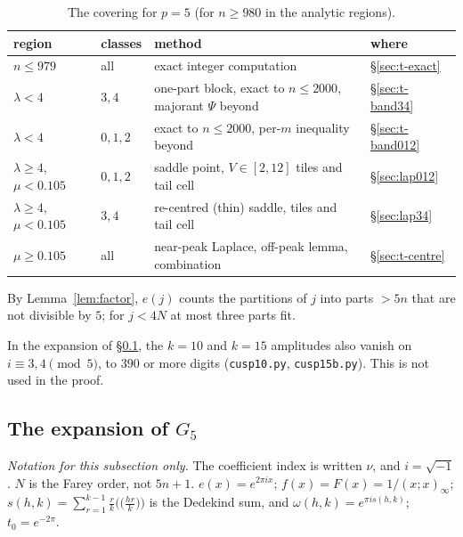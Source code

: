 \begin{table}[h]
\centering
\small
\begin{tabular}{llll}
\toprule
region & classes & method & where\\
\midrule
$n\le979$ & all & exact integer computation & \S\ref{sec:t-exact}\\
$\lambda<4$ & $3,4$ & one-part block, exact to $n\le2000$, majorant $\Psi$ beyond & \S\ref{sec:t-band34}\\
$\lambda<4$ & $0,1,2$ & exact to $n\le2000$, per-$m$ inequality beyond & \S\ref{sec:t-band012}\\
$\lambda\ge4$, $\mu<0.105$ & $0,1,2$ & saddle point, $V\in[2,12]$ tiles and tail cell & \S\ref{sec:lap012}\\
$\lambda\ge4$, $\mu<0.105$ & $3,4$ & re-centred (thin) saddle, tiles and tail cell & \S\ref{sec:lap34}\\
$\mu\ge0.105$ & all & near-peak Laplace, off-peak lemma, combination & \S\ref{sec:t-centre}\\
\bottomrule
\end{tabular}
\caption{The covering for $p=5$ (for $n\ge980$ in the analytic regions).}
\label{tab:regions5}
\end{table}

By Lemma~\ref{lem:factor}, $e(j)$ counts the partitions of $j$ into parts $>5n$ that are not divisible by $5$; for $j<4N$
at most three parts fit.

\begin{remark}
In the expansion of \S\ref{sec:G5}, the $k=10$ and $k=15$ amplitudes also vanish on $i\equiv3,4\pmod 5$, to $390$ or more
digits (\texttt{cusp10.py}, \texttt{cusp15b.py}). This is not used in the proof.
\end{remark}

\subsection{The expansion of \texorpdfstring{$G_5$}{G5}}\label{sec:G5}

\emph{Notation for this subsection only.} The coefficient index is written $\nu$, and $i=\sqrt{-1}$. $N$ is the Farey
order, not $5n+1$. $e(x)=e^{2\pi ix}$; $f(x)=F(x)=1/(x;x)_\infty$; $s(h,k)=\sum_{r=1}^{k-1}\frac rk\big(\big(\frac{hr}k\big)\big)$
is the Dedekind sum, and $\omega(h,k)=e^{\pi is(h,k)}$; $t_0=e^{-2\pi}$.

